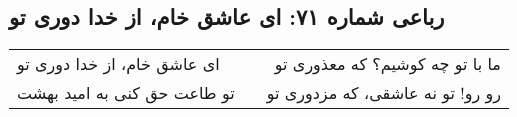 \begin{center}
\section*{رباعی شماره ۷۱: ای عاشق خام، از خدا دوری تو}
\label{sec:071}
\begin{longtable}{l p{0.5cm} r}
ای عاشق خام، از خدا دوری تو
&&
ما با تو چه کوشیم؟ که معذوری تو
\\
تو طاعت حق کنی به امید بهشت
&&
رو رو! تو نه عاشقی، که مزدوری تو
\\
\end{longtable}
\end{center}
